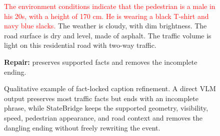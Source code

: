 \documentclass[runningheads]{llncs}
\newcommand{\legendbox}[2]{%
    \textcolor{#1}{\rule{0.8em}{0.4em}}~#2%
}
\begin{document}
\begin{figure}[h!]
\begin{minipage}[t]{0.49\textwidth}
{\begin{minipage}[t]{0.90\linewidth}
        \textcolor{red}{The environment conditions indicate that the pedestrian is a male in his 20s, with a height of 170 cm. He is wearing a black T-shirt and navy blue slacks.}
        \textcolor{cyan!70!black}{The weather is cloudy, with dim brightness. The road surface is dry and level, made of asphalt. The traffic volume is light on this residential road with two-way traffic.}
        \par\vspace{0.35em}
        \textcolor{green!45!black}{\textbf{Repair:}} preserves supported facts and removes the incomplete ending.
    \end{minipage}}
    \end{minipage}


    \endgroup
    \caption{Qualitative example of fact-locked caption refinement. A direct VLM output preserves most traffic facts but ends with an incomplete phrase, while StateBridge keeps the supported geometry, visibility, speed, pedestrian appearance, and road context and removes the dangling ending without freely rewriting the event.}
    \label{fig:caption_repair}
\end{figure}
\end{document}
